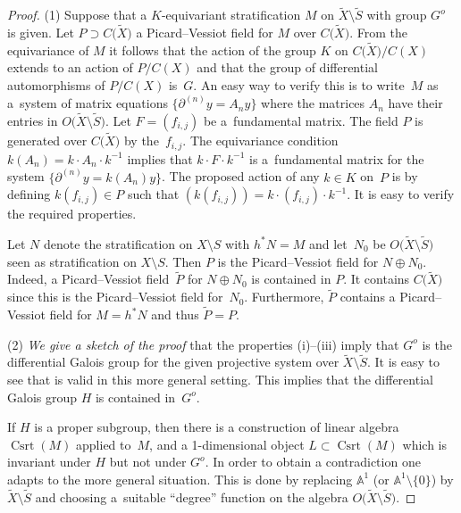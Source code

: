 \documentclass[pdftex]{sigma}
\numberwithin{equation}{section}
\begin{document}
\begin{proof} (1) Suppose that a $K$-equivariant stratification $M$ on $\tilde{X}\setminus \tilde{S}$ with group $G^o$ is given. Let $P\supset C\big(\tilde{X}\big)$ a Picard--Vessiot field for $M$ over $C\big(\tilde{X}\big)$. From the equivariance of $M$ it follows that the action of the group $K$ on $C\big(\tilde{X}\big)/C(X)$ extends to an action of $P/C(X)$ and that the group of differential automorphisms of $P/C(X)$ is~$G$. An easy way to verify this is to write~$M$ as a~system of matrix equations $\big\{\partial^{(n)}y=A_ny\big\}$ where the matrices $A_n$ have their entries in $O\big(\tilde{X}\setminus \tilde{S}\big)$. Let $F=(f_{i,j})$ be a~fundamental matrix. The field $P$ is generated over $C\big(\tilde{X}\big)$ by the~$f_{i,j}$. The equivariance condition $k(A_n)= k\cdot A_n\cdot k^{-1}$ implies that $k\cdot F\cdot k^{-1}$ is a~fundamental matrix for the system $\big\{\partial ^{(n)}y=k(A_n)y\big\}$. The proposed action of any $k\in K$ on~$P$ is by defining $k(f_{i,j})\in P$ such that $(k(f_{i,j}))=k\cdot (f_{i,j})\cdot k^{-1}$. It is easy to verify the required properties.

Let $N$ denote the stratification on $X\setminus S$ with $h^*N=M$ and let~$N_0$ be $O\big(\tilde{X}\setminus \tilde{S}\big)$ seen as stratification on $X\setminus S$. Then $P$ is the Picard--Vessiot field for $N\oplus N_0$. Indeed, a Picard--Vessiot field~$\tilde{P}$ for $N\oplus N_0$ is contained in $P$. It contains $C\big(\tilde{X}\big)$ since this is the Picard--Vessiot field for~$N_0$. Furthermore, $\tilde{P}$ contains a Picard--Vessiot field for $M=h^*N$ and thus $\tilde{P}=P$.

(2) {\it We give a sketch of the proof} that the properties (i)--(iii) imply that $G^o$ is the differential Galois group for the given projective system over $\tilde{X}\setminus \tilde{S}$. It is easy to see that \cite[Proposition~5.3]{Ma-vdP1} is valid in this more general setting. This implies that the differential Galois group $H$ is contained in~$G^o$.

If $H$ is a proper subgroup, then there is a construction of linear algebra $\operatorname{Csrt}(M)$ applied to~$M$, and a 1-dimensional object $L\subset \operatorname{Csrt}(M)$ which is invariant under $H$ but not under $G^o$. In order to obtain a contradiction one adapts \cite[Lemma~7.4]{Ma-vdP1} to the more general situation. This is done by replacing
$\mathbb{A}^1$ (or $\mathbb{A}^1\setminus \{0\}$) by $\tilde{X}\setminus \tilde{S}$ and choosing a~suitable ``degree'' function on the algebra $O\big(\tilde{X}\setminus \tilde{S}\big)$. \end{proof}
\end{document}
